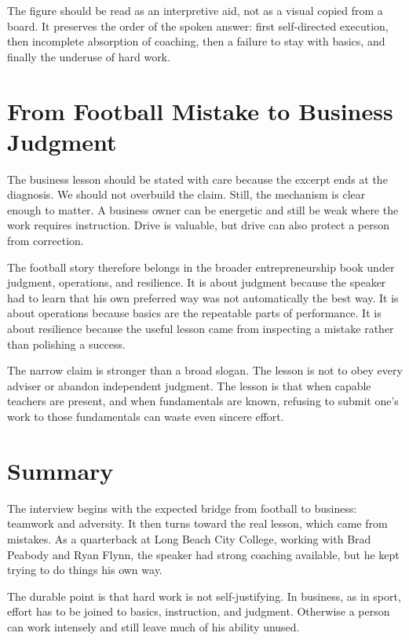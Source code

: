 The figure should be read as an interpretive aid, not as a visual copied from a board. It preserves the order of the spoken answer: first self-directed execution, then incomplete absorption of coaching, then a failure to stay with basics, and finally the underuse of hard work.

\section{From Football Mistake to Business Judgment}

The business lesson should be stated with care because the excerpt ends at the diagnosis. We should not overbuild the claim. Still, the mechanism is clear enough to matter. A business owner can be energetic and still be weak where the work requires instruction. Drive is valuable, but drive can also protect a person from correction.

The football story therefore belongs in the broader entrepreneurship book under judgment, operations, and resilience. It is about judgment because the speaker had to learn that his own preferred way was not automatically the best way. It is about operations because basics are the repeatable parts of performance. It is about resilience because the useful lesson came from inspecting a mistake rather than polishing a success.

The narrow claim is stronger than a broad slogan. The lesson is not to obey every adviser or abandon independent judgment. The lesson is that when capable teachers are present, and when fundamentals are known, refusing to submit one's work to those fundamentals can waste even sincere effort.

\section{Summary}

The interview begins with the expected bridge from football to business: teamwork and adversity. It then turns toward the real lesson, which came from mistakes. As a quarterback at Long Beach City College, working with Brad Peabody and Ryan Flynn, the speaker had strong coaching available, but he kept trying to do things his own way.

The durable point is that hard work is not self-justifying. In business, as in sport, effort has to be joined to basics, instruction, and judgment. Otherwise a person can work intensely and still leave much of his ability unused.